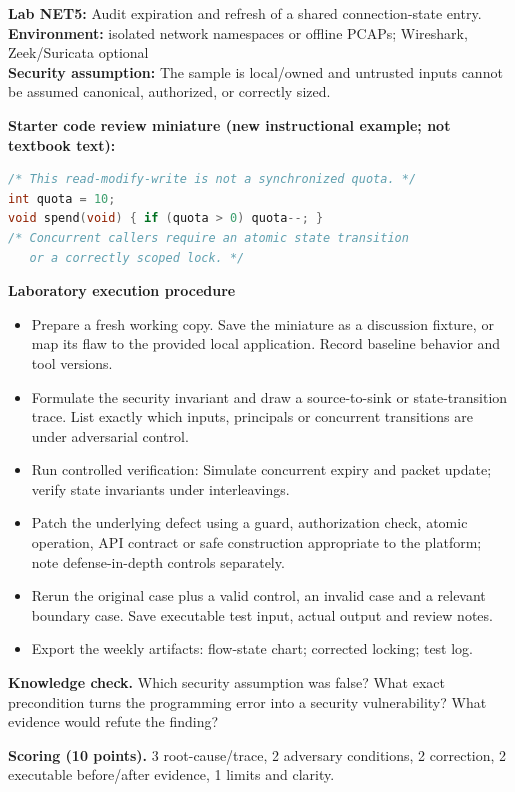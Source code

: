 \documentclass[10pt,letterpaper]{article}
\begin{document}
\begin{insight}\textbf{Lab NET5:} Audit expiration and refresh of a shared connection-state entry.\\\textbf{Environment:} isolated network namespaces or offline PCAPs; Wireshark, Zeek/Suricata optional\\\textbf{Security assumption:} The sample is local/owned and untrusted inputs cannot be assumed canonical, authorized, or correctly sized.\end{insight}
\textbf{Starter code review miniature (new instructional example; not textbook text):}
\begin{lstlisting}[language=C]
/* This read-modify-write is not a synchronized quota. */
int quota = 10;
void spend(void) { if (quota > 0) quota--; }
/* Concurrent callers require an atomic state transition
   or a correctly scoped lock. */
\end{lstlisting}
\textbf{Laboratory execution procedure}
\begin{itemize}[leftmargin=*,itemsep=2pt]
\item Prepare a fresh working copy. Save the miniature as a discussion fixture, or map its flaw to the provided local application. Record baseline behavior and tool versions.
\item Formulate the security invariant and draw a source-to-sink or state-transition trace. List exactly which inputs, principals or concurrent transitions are under adversarial control.
\item Run controlled verification: Simulate concurrent expiry and packet update; verify state invariants under interleavings.
\item Patch the underlying defect using a guard, authorization check, atomic operation, API contract or safe construction appropriate to the platform; note defense-in-depth controls separately.
\item Rerun the original case plus a valid control, an invalid case and a relevant boundary case. Save executable test input, actual output and review notes.
\item Export the weekly artifacts: flow-state chart; corrected locking; test log.
\end{itemize}
\textbf{Knowledge check.} Which security assumption was false? What exact precondition turns the programming error into a security vulnerability? What evidence would refute the finding?

\textbf{Scoring (10 points).} 3 root-cause/trace, 2 adversary conditions, 2 correction, 2 executable before/after evidence, 1 limits and clarity.
\end{document}
